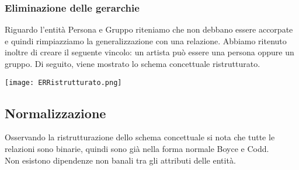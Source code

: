 \documentclass[a4paper,11pt]{article}
\begin{document}
\subsubsection*{Eliminazione delle gerarchie}

Riguardo l'entità Persona e Gruppo riteniamo che non debbano essere accorpate e quindi rimpiazziamo la generalizzazione con una relazione.
Abbiamo ritenuto inoltre di creare il seguente vincolo: un artista può essere una persona oppure un gruppo.
Di seguito, viene mostrato lo schema concettuale ristrutturato.

\texttt{[image: ERRistrutturato.png]}

\subsection{Normalizzazione}

Osservando la ristrutturazione dello schema concettuale si nota che tutte le relazioni sono binarie, quindi sono già nella forma normale Boyce e Codd.\\
Non esistono dipendenze non banali tra gli attributi delle entità.
\end{document}
